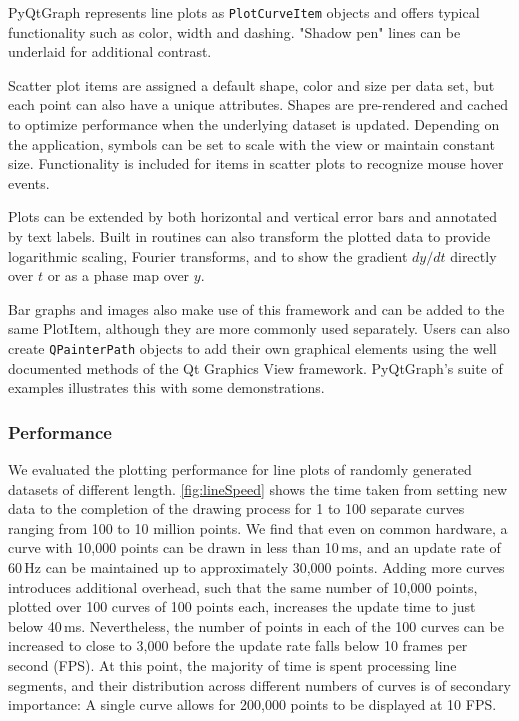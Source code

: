 PyQtGraph represents line plots as \texttt{PlotCurveItem} objects and offers typical functionality such as color, width and dashing. "Shadow pen" lines can be underlaid for additional contrast.

Scatter plot items are assigned a default shape, color and size per data set, but each point can also have a unique attributes. Shapes are pre-rendered and cached to optimize performance when the underlying dataset is updated. Depending on the application, symbols can be set to scale with the view or maintain constant size.  Functionality is included for items in scatter plots to recognize mouse hover events.

Plots can be extended by both horizontal and vertical error bars and annotated by text labels. Built in routines can also transform the plotted data to provide logarithmic scaling, Fourier transforms, and to show the gradient $dy/dt$ directly over $t$ or as a phase map over $y$.

Bar graphs and images also make use of this framework and can be added to the same PlotItem, although they are more commonly used separately. Users can also create \texttt{QPainterPath} objects to add their own graphical elements using the well documented methods of the Qt Graphics View framework. PyQtGraph's suite of examples \citep{pg_examples} illustrates this with some demonstrations.


\subsubsection{Performance}

We evaluated the plotting performance for line plots of randomly generated datasets of different length. \autoref{fig:lineSpeed} shows the time taken from setting new data to the completion of the drawing process for 1 to 100 separate curves ranging from 100 to 10 million points. We find that even on common hardware, a curve with 10,000 points can be drawn in less than 10\,ms, and an update rate of 60\,Hz can be maintained up to approximately 30,000 points. Adding more curves introduces additional overhead, such that the same number of 10,000 points, plotted over 100 curves of 100 points each, increases the update time to just below 40\,ms. Nevertheless, the number of points in each of the 100 curves can be increased to close to 3,000 before the update rate falls below 10 frames per second (FPS). At this point, the majority of time is spent processing line segments, and their distribution across different numbers of curves is of secondary importance: A single curve allows for 200,000 points to be displayed at 10 FPS.

